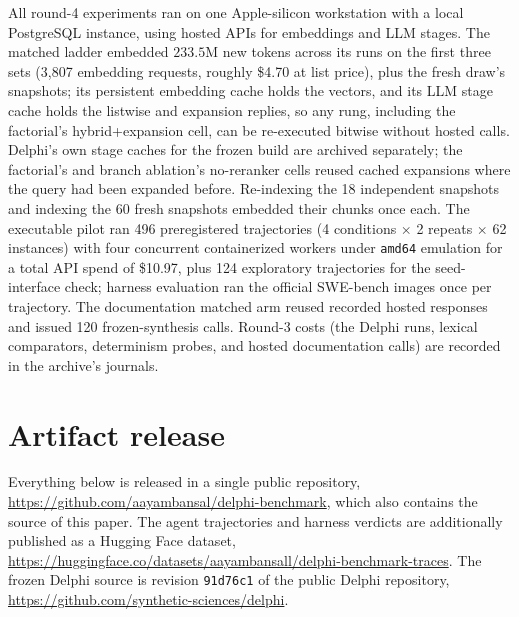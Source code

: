 \documentclass{article}
\newcommand{\system}{Delphi}
\begin{document}
All round-4 experiments ran on one Apple-silicon workstation with a local PostgreSQL instance, using hosted APIs for embeddings and LLM stages. The matched ladder embedded $233.5$M new tokens across its runs on the first three sets (3{,}807 embedding requests, roughly \$4.70 at list price), plus the fresh draw's snapshots; its persistent embedding cache holds the vectors, and its LLM stage cache holds the listwise and expansion replies, so any rung, including the factorial's hybrid+expansion cell, can be re-executed bitwise without hosted calls. \system{}'s own stage caches for the frozen build are archived separately; the factorial's and branch ablation's no-reranker cells reused cached expansions where the query had been expanded before. Re-indexing the 18 independent snapshots and indexing the 60 fresh snapshots embedded their chunks once each. The executable pilot ran 496 preregistered trajectories (4 conditions $\times$ 2 repeats $\times$ 62 instances) with four concurrent containerized workers under \texttt{amd64} emulation for a total API spend of \$10.97, plus 124 exploratory trajectories for the seed-interface check; harness evaluation ran the official SWE-bench images once per trajectory. The documentation matched arm reused recorded hosted responses and issued 120 frozen-synthesis calls. Round-3 costs (the \system{} runs, lexical comparators, determinism probes, and hosted documentation calls) are recorded in the archive's journals.

\section{Artifact release}
\label{app:release}

Everything below is released in a single public repository, \url{https://github.com/aayambansal/delphi-benchmark}, which also contains the source of this paper. The agent trajectories and harness verdicts are additionally published as a Hugging Face dataset, \url{https://huggingface.co/datasets/aayambansall/delphi-benchmark-traces}. The frozen \system{} source is revision \texttt{91d76c1} of the public \system{} repository, \url{https://github.com/synthetic-sciences/delphi}.
\end{document}
